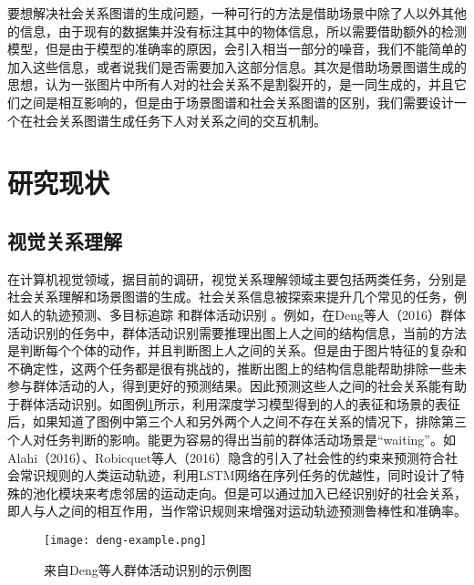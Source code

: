 要想解决社会关系图谱的生成问题，一种可行的方法是借助场景中除了人以外其他的信息，由于现有的数据集并没有标注其中的物体信息，所以需要借助额外的检测模型，但是由于模型的准确率的原因，会引入相当一部分的噪音，我们不能简单的加入这些信息，或者说我们是否需要加入这部分信息。其次是借助场景图谱生成的思想，认为一张图片中所有人对的社会关系不是割裂开的，是一同生成的，并且它们之间是相互影响的，但是由于场景图谱和社会关系图谱的区别，我们需要设计一个在社会关系图谱生成任务下人对关系之间的交互机制。

\section{研究现状}

\subsection{视觉关系理解}
在计算机视觉领域，据目前的调研，视觉关系理解领域主要包括两类任务，分别是社会关系理解和场景图谱的生成。社会关系信息被探索来提升几个常见的任务，例如人的轨迹预测、多目标追踪
\cite{chen2012discovering,qin2012improving}和群体活动识别
\cite{direkoglu2012team,lan2012social,lan2012discriminative}。例如，在Deng等人（2016）\cite{deng2016structure}群体活动识别的任务中，群体活动识别需要推理出图上人之间的结构信息，当前的方法是判断每个个体的动作，并且判断图上人之间的关系。但是由于图片特征的复杂和不确定性，这两个任务都是很有挑战的，推断出图上的结构信息能帮助排除一些未参与群体活动的人，得到更好的预测结果。因此预测这些人之间的社会关系能有助于群体活动识别。如图例\ref{fig:deng-example}所示，利用深度学习模型得到的人的表征和场景的表征后，如果知道了图例中第三个人和另外两个人之间不存在关系的情况下，排除第三个人对任务判断的影响。能更为容易的得出当前的群体活动场景是``waiting''。如Alahi（2016）\cite{alahi2016social}、Robicquet等人（2016）\cite{robicquet2016learning}隐含的引入了社会性的约束来预测符合社会常识规则的人类运动轨迹，利用LSTM网络在序列任务的优越性，同时设计了特殊的池化模块来考虑邻居的运动走向。但是可以通过加入已经识别好的社会关系，即人与人之间的相互作用，当作常识规则来增强对运动轨迹预测鲁棒性和准确率。
\begin{figure}[htpb]
	\centering
	\texttt{[image: deng-example.png]}
    \caption{来自Deng等人\cite{deng2016structure}群体活动识别的示例图}
	\vspace*{-3.5mm}
	\label{fig:deng-example}
\end{figure}

